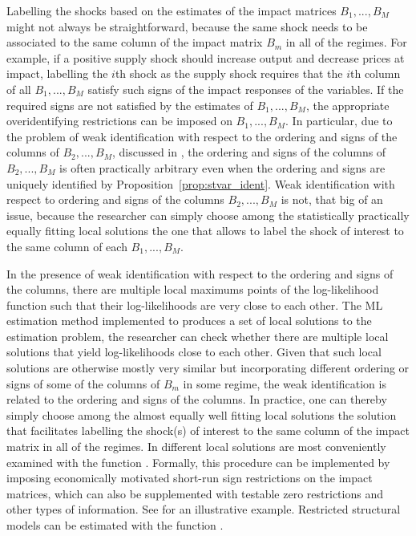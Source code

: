 \documentclass[nojss]{jss}
\begin{document}
Labelling the shocks based on the estimates of the impact matrices $B_1,...,B_M$ might not always be straightforward, because the same shock needs to be associated to the same column of the impact matrix $B_m$ in all of the regimes. For example, if a positive supply shock should increase output and decrease prices at impact, labelling the $i$th shock as the supply shock requires that the $i$th column of all $B_1,...,B_M$ satisfy such signs of the impact responses of the variables. If the required signs are not satisfied by the estimates of $B_1,...,B_M$, the appropriate overidentifying restrictions can be imposed on $B_1,...,B_M$. In particular, due to the problem of weak identification with respect to the ordering and signs of the columns of $B_2,...,B_M$, discussed in \cite{Virolainen2:2024}, the ordering and signs of the columns of $B_2,...,B_M$ is often practically arbitrary even when the ordering and signs are uniquely identified by Proposition~\ref{prop:stvar_ident}. Weak identification with respect to ordering and signs of the columns $B_2,...,B_M$ is not, that big of an issue, because the researcher can simply choose among the statistically practically equally fitting local solutions the one that allows to label the shock of interest to the same column of each $B_1,...,B_M$.

In the presence of weak identification with respect to the ordering and signs of the columns, there are multiple local maximums points of the log-likelihood function such that their log-likelihoods are very close to each other. The ML estimation method implemented to  produces a set of local solutions to the estimation problem, the researcher can check whether there are multiple local solutions that yield log-likelihoods close to each other. Given that such local solutions are otherwise mostly very similar but incorporating different ordering or signs of some of the columns of $B_m$ in some regime, the weak identification is related to the ordering and signs of the columns. In practice, one can thereby simply choose among the almost equally well fitting local solutions the solution that facilitates labelling the shock(s) of interest to the same column of the impact matrix in all of the regimes. In  different local solutions are most conveniently examined with the function . Formally, this procedure can be implemented by imposing economically motivated short-run sign restrictions on the impact matrices, which can also be supplemented with testable zero restrictions and other types of information. See \cite{Virolainen2:2024} for an illustrative example. Restricted structural models can be estimated with the function .
\end{document}
